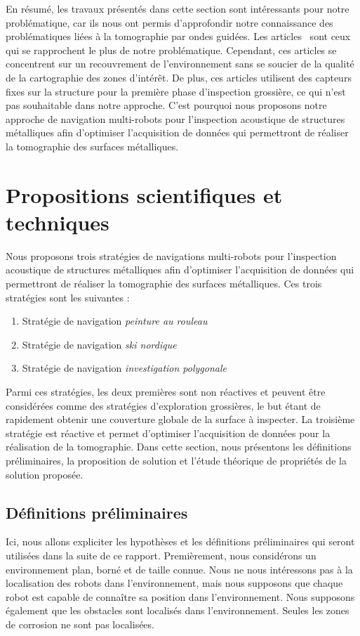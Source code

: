 \documentclass[francais,RandD]{rapportPFE}
\begin{document}
		En résumé, les travaux présentés dans cette section sont intéressants pour notre problématique, car ils nous ont permis d'approfondir notre connaissance des problématiques liées à la tomographie par ondes guidées.
		Les articles~\cite{7487624, 7139673} sont ceux qui se rapprochent le plus de notre problématique.
		Cependant, ces articles se concentrent sur un recouvrement de l'environnement sans se soucier de la qualité de la cartographie des zones d'intérêt.
		De plus, ces articles utilisent des capteurs fixes sur la structure pour la première phase d'inspection grossière, ce qui n'est pas souhaitable dans notre approche.
		C'est pourquoi nous proposons notre approche de navigation multi-robots pour l'inspection acoustique de structures métalliques afin d'optimiser l'acquisition de données qui permettront de réaliser la tomographie des surfaces métalliques.
	\section{Propositions scientifiques et techniques}
		Nous proposons trois stratégies de navigations multi-robots pour l'inspection acoustique de structures métalliques afin d'optimiser l'acquisition de données qui permettront de réaliser la tomographie des surfaces métalliques. Ces trois stratégies sont les suivantes :
		\begin{enumerate}
			\item Stratégie de navigation \textit{peinture au rouleau}
			\item Stratégie de navigation \textit{ski nordique}
			\item Stratégie de navigation \textit{investigation polygonale}
		\end{enumerate}
		Parmi ces stratégies, les deux premières sont non réactives et peuvent être considérées comme des stratégies d'exploration grossières, le but étant de rapidement obtenir une couverture globale de la surface à inspecter.
		La troisième stratégie est réactive et permet d'optimiser l'acquisition de données pour la réalisation de la tomographie.
		Dans cette section, nous présentons les définitions préliminaires, la proposition de solution et l'étude théorique de propriétés de la solution proposée.
		\subsection{Définitions préliminaires}\label{sec:definitions}
			Ici, nous allons expliciter les hypothèses et les définitions préliminaires qui seront utilisées dans la suite de ce rapport.
			Premièrement, nous considérons un environnement plan, borné et de taille connue.
			Nous ne nous intéressons pas à la localisation des robots dans l'environnement, mais nous supposons que chaque robot est capable de connaître sa position dans l'environnement.
			Nous supposons également que les obstacles sont localisés dans l'environnement.
			Seules les zones de corrosion ne sont pas localisées.
\end{document}
